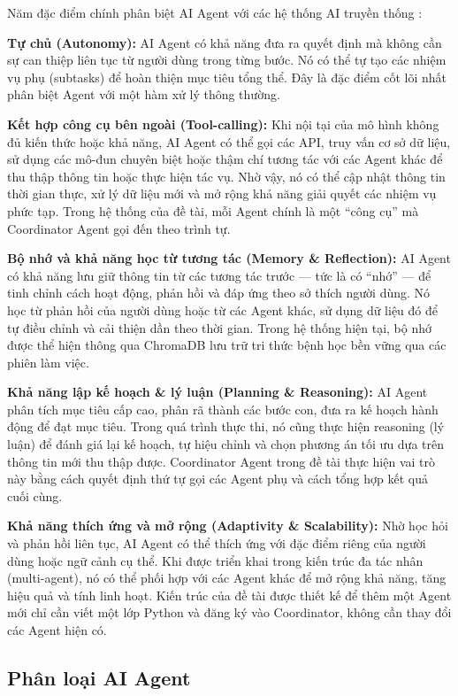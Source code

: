 Năm đặc điểm chính phân biệt AI Agent với các hệ thống AI truyền thống \cite{sumers2023}:

\textbf{Tự chủ (Autonomy):} AI Agent có khả năng đưa ra quyết định mà không cần sự can thiệp liên tục từ người dùng trong từng bước. Nó có thể tự tạo các nhiệm vụ phụ (subtasks) để hoàn thiện mục tiêu tổng thể. Đây là đặc điểm cốt lõi nhất phân biệt Agent với một hàm xử lý thông thường.

\textbf{Kết hợp công cụ bên ngoài (Tool-calling):} Khi nội tại của mô hình không đủ kiến thức hoặc khả năng, AI Agent có thể gọi các API, truy vấn cơ sở dữ liệu, sử dụng các mô-đun chuyên biệt hoặc thậm chí tương tác với các Agent khác để thu thập thông tin hoặc thực hiện tác vụ. Nhờ vậy, nó có thể cập nhật thông tin thời gian thực, xử lý dữ liệu mới và mở rộng khả năng giải quyết các nhiệm vụ phức tạp. Trong hệ thống của đề tài, mỗi Agent chính là một ``công cụ'' mà Coordinator Agent gọi đến theo trình tự.

\textbf{Bộ nhớ và khả năng học từ tương tác (Memory \& Reflection):} AI Agent có khả năng lưu giữ thông tin từ các tương tác trước --- tức là có ``nhớ'' --- để tinh chỉnh cách hoạt động, phản hồi và đáp ứng theo sở thích người dùng. Nó học từ phản hồi của người dùng hoặc từ các Agent khác, sử dụng dữ liệu đó để tự điều chỉnh và cải thiện dần theo thời gian. Trong hệ thống hiện tại, bộ nhớ được thể hiện thông qua ChromaDB lưu trữ tri thức bệnh học bền vững qua các phiên làm việc.

\textbf{Khả năng lập kế hoạch \& lý luận (Planning \& Reasoning):} AI Agent phân tích mục tiêu cấp cao, phân rã thành các bước con, đưa ra kế hoạch hành động để đạt mục tiêu. Trong quá trình thực thi, nó cũng thực hiện reasoning (lý luận) để đánh giá lại kế hoạch, tự hiệu chỉnh và chọn phương án tối ưu dựa trên thông tin mới thu thập được. Coordinator Agent trong đề tài thực hiện vai trò này bằng cách quyết định thứ tự gọi các Agent phụ và cách tổng hợp kết quả cuối cùng.

\textbf{Khả năng thích ứng và mở rộng (Adaptivity \& Scalability):} Nhờ học hỏi và phản hồi liên tục, AI Agent có thể thích ứng với đặc điểm riêng của người dùng hoặc ngữ cảnh cụ thể. Khi được triển khai trong kiến trúc đa tác nhân (multi-agent), nó có thể phối hợp với các Agent khác để mở rộng khả năng, tăng hiệu quả và tính linh hoạt. Kiến trúc của đề tài được thiết kế để thêm một Agent mới chỉ cần viết một lớp Python và đăng ký vào Coordinator, không cần thay đổi các Agent hiện có.

\subsection{Phân loại AI Agent}

